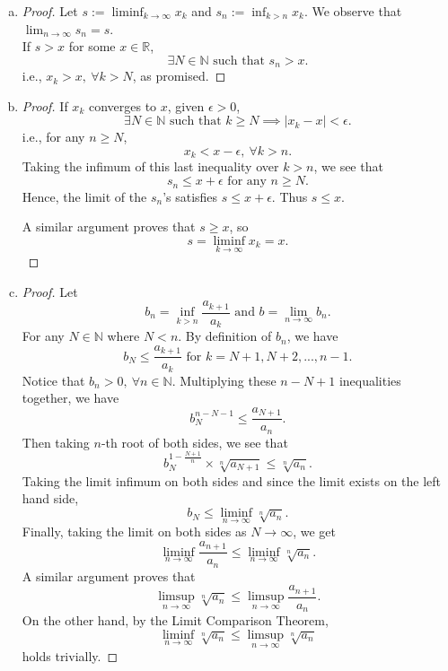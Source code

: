 \begin{Exercise}
\begin{enumerate}[a)]
\item
\begin{proof}
Let $s:=\liminf_{k\to\infty}x_k$ and $s_n := \inf_{k>n}x_k$. We observe that $\lim_{n\to\infty}s_n = s$.\\
If $s>x$ for some $x\in\mathbb{R}$, $$\exists N\in\mathbb{N}\text{ such that } s_n>x.$$ i.e., $x_k>x,\ \forall k > N$, as promised.
\end{proof}

\item
\begin{proof}
If $x_k$ converges to $x$, given $\epsilon > 0$, $$\exists N \in\mathbb{N}\text{ such that } k\geq N \implies \left|x_k-x\right|<\epsilon.$$
i.e., for any $n\geq N$, $$x_k<x-\epsilon,\ \forall k>n.$$
Taking the infimum of this last inequality over $k>n$, we see that $$s_n\leq x+\epsilon\text{ for any } n\geq N.$$ Hence, the limit of the $s_n$'s satisfies $s\leq x+\epsilon$. Thus $s\leq x$.

\vspace{2ex}

A similar argument proves that $s\geq x$, so $$s=\liminf_{k\to\infty}x_k=x.$$
\end{proof}

\item
\begin{proof}
Let $$b_n = \inf_{k>n}\frac{a_{k+1}}{a_k} \text{ and } b = \lim_{n\to\infty}b_n.$$
For any $N\in\mathbb{N}$ where $N<n$. By definition of $b_n$, we have $$ b_N\leq\frac{a_{k+1}}{a_k}\text{ for } k=N+1,N+2,...,n-1.$$
Notice that $b_n>0,\ \forall n\in\mathbb{N}$. Multiplying these $n-N+1$ inequalities together, we have $$b_N^{n-N-1}\leq\frac{a_{N+1}}{a_n}.$$ Then taking $n$-th root of both sides, we see that $$b_N^{1-\frac{N+1}{n}} \times \sqrt[n]{a_{N+1}} \leq \sqrt[n]{a_n}.$$
Taking the limit infimum on both sides and since the limit exists on the left hand side, $$b_N \leq \liminf_{n\to\infty}\sqrt[n]{a_n}.$$
Finally, taking the limit on both sides as $N\to\infty$, we get $$\liminf_{n\to\infty}\frac{a_{n+1}}{a_n} \leq  \liminf_{n\to\infty}\sqrt[n]{a_n}.$$
A similar argument proves that  $$\limsup_{n\to\infty}\sqrt[n]{a_n} \leq \limsup_{n\to\infty}\frac{a_{n+1}}{a_n}.$$
On the other hand, by the Limit Comparison Theorem, $$\liminf_{n\to\infty}\sqrt[n]{a_n} \leq \limsup_{n\to\infty}\sqrt[n]{a_n}$$
holds trivially. 

\vspace{2ex}


\end{proof}
\end{enumerate}
\end{Exercise}
